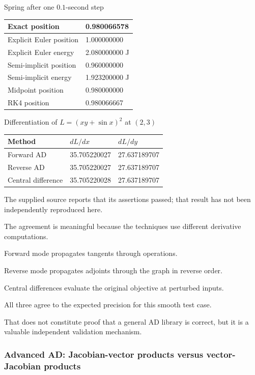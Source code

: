 Spring after one \(0.1\)-second step

{\def\LTcaptype{none} %
\begin{longtable}[]{@{}ll@{}}
\toprule\noalign{}
Exact position & 0.980066578 \\
\midrule\noalign{}
\endhead
\bottomrule\noalign{}
\endlastfoot
Explicit Euler position & 1.000000000 \\
Explicit Euler energy & 2.080000000 J \\
Semi-implicit position & 0.960000000 \\
Semi-implicit energy & 1.923200000 J \\
Midpoint position & 0.980000000 \\
RK4 position & 0.980066667 \\
\end{longtable}
}

Differentiation of \(L=(xy+\sin x)^2\) at \((2,3)\)

{\def\LTcaptype{none} %
\begin{longtable}[]{@{}lll@{}}
\toprule\noalign{}
Method & \(dL/dx\) & \(dL/dy\) \\
\midrule\noalign{}
\endhead
\bottomrule\noalign{}
\endlastfoot
Forward AD & 35.705220027 & 27.637189707 \\
Reverse AD & 35.705220027 & 27.637189707 \\
Central difference & 35.705220028 & 27.637189707 \\
\end{longtable}
}

The supplied source reports that its assertions passed; that result has not been independently reproduced here.

The agreement is meaningful because the techniques use different derivative computations.

Forward mode propagates tangents through operations.

Reverse mode propagates adjoints through the graph in reverse order.

Central differences evaluate the original objective at perturbed inputs.

All three agree to the expected precision for this smooth test case.

That does not constitute proof that a general AD library is correct, but it is a valuable independent validation mechanism.

\subsubsection{Advanced AD: Jacobian-vector products versus vector-Jacobian products}\label{advanced-ad-jacobian-vector-products-versus-vector-jacobian-products}

